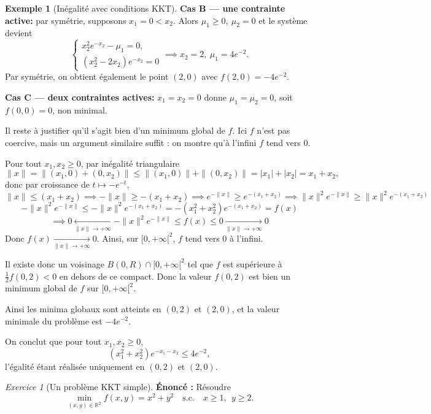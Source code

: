 \documentclass[a4paper,12pt,openany]{book}
\theoremstyle{plain}
\theoremstyle{definition}
\newtheorem{example}[theorem]{Exemple}
\theoremstyle{remark}
\newtheorem{exercise}{Exercice}[section]
\theoremstyle{nbstyle}
\begin{document}
\begin{example}[Inégalité avec conditions KKT]
		\textbf{Cas B — une contrainte active:} par symétrie, supposons \(x_1=0<x_2\). Alors \(\mu_1\ge0,\ \mu_2=0\) et le système devient
		\[
		\begin{cases}
		x_2^2 e^{-x_2}-\mu_1=0,\\
		(x_2^2-2x_2)e^{-x_2}=0
		\end{cases} \implies x_2=2, \ \mu_1=4e^{-2}.
		\]
		Par symétrie, on obtient également le point \((2,0)\) avec \(f(2,0)=-4e^{-2}\).
		
		\textbf{Cas C — deux contraintes actives:} \(x_1=x_2=0\) donne \(\mu_1=\mu_2=0\), soit \(f(0,0)=0\), non minimal.
		
		Il reste à justifier qu’il s’agit bien d’un minimum global de $f$. Ici $f$ n’est pas coercive, mais un
		argument similaire suffit : on montre qu’à l’infini $f$ tend vers 0. 
		
		Pour tout $x_1, x_2 \geqslant 0$, par inégalité
		triangulaire
		$$ \|x\| = \|(x_1, 0) + (0, x_2)\| \leqslant \|(x_1, 0)\| + \|(0, x_2)\| = |x_1| + |x_2| = x_1 + x_2 ,$$
		donc par croissance de $t \mapsto -e^{-t}$,
		$$ \|x\| \leqslant (x_1 + x_2) \implies -\|x\| \geqslant -(x_1 + x_2) \implies e^{-\|x\|} \geqslant e^{-(x_1+x_2)} \implies \|x\|^2e^{-\|x\|} \geqslant \|x\|^2e^{-(x_1+x_2)} $$
		$$ -\|x\|^2e^{-\|x\|} \leqslant -\|x\|^2e^{-(x_1+x_2)} = -(x_1^2+x_2^2)e^{-(x_1+x_2)} = f(x) $$$$\implies 0 \xleftarrow[\|x\| \to +\infty]{} -\|x\|^2e^{-\|x\|} \leqslant f(x) \leqslant 0 \xrightarrow[\|x\| \to +\infty]{} 0 $$
		Donc $f(x) \xrightarrow[\|x\| \to +\infty]{} 0$. Ainsi, sur $[0, +\infty[^2$, $f$ tend vers 0 à l’infini. 
		
		Il existe donc un voisinage $B(0, R) \cap
		[0, +\infty[^2$ tel que $f$ est supérieure à $\frac{1}{2}f(0, 2) < 0$ en dehors de ce compact. Donc la valeur $f(0, 2)$ est bien
		un minimum global de $f$ sur $[0, +\infty[^2$.
		
		Ainsi les minima globaux sont atteints en \((0,2)\) et \((2,0)\), et la valeur minimale du problème est \(-4e^{-2}\).
		
		On conclut que pour tout \(x_1,x_2\ge0\),
		\[
		(x_1^2+x_2^2)e^{-x_1-x_2}\le 4e^{-2},
		\]
		l’égalité étant réalisée uniquement en \((0,2)\) et \((2,0)\).
	\end{example}
	
	
	
	\begin{exercise}[Un problème KKT simple]
		\textbf{Énoncé :} Résoudre
		\[\displaystyle\min_{(x,y)\in\mathbb{R}^2} f(x,y)=x^2+y^2\quad\text{s.c.}\quad x\ge1,\ \ y\ge2.\]
		
	\end{exercise}
	
\end{document}
